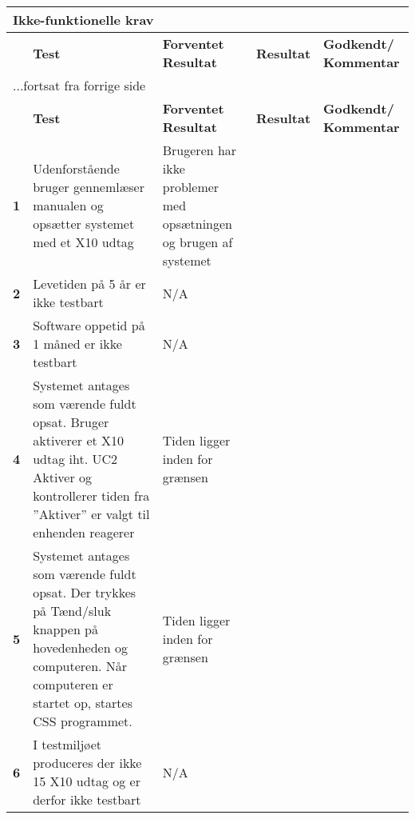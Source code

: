 
\begin{center}
\begin{longtable}{|p{}|p{}|p{}|p{}|p{}|} %
\hline
\multicolumn{5}{|l|}{\textbf{Ikke-funktionelle krav}} \\ \hline
\multicolumn{1}{|c|}{} &
\textbf{Test} &
\textbf{Forventet \newline Resultat} &
\textbf{Resultat} &
\textbf{Godkendt/ \newline Kommentar} \\ \hline 
\endfirsthead

\multicolumn{5}{l}{...fortsat fra forrige side} \\ \hline 
\multicolumn{1}{|c|}{} &
\textbf{Test} &
\textbf{Forventet \newline Resultat} &
\textbf{Resultat} &
\textbf{Godkendt/ \newline Kommentar} \\ \hline 
\endhead


\textbf{1} &
Udenforstående bruger gennemlæser manualen og opsætter systemet med et X10 udtag &
Brugeren har ikke problemer med opsætningen og brugen af systemet &
 &
  \\\hline

\textbf{2} &
Levetiden på 5 år er ikke testbart &
N/A &
 &
 \\\hline

\textbf{3} &
Software oppetid på 1 måned er ikke testbart &
N/A &
 &
 \\\hline

\textbf{4} &
Systemet antages som værende fuldt opsat.\newline
Bruger aktiverer et X10 udtag iht. UC2 Aktiver og kontrollerer tiden fra ''Aktiver'' er valgt til enhenden reagerer&
Tiden ligger inden for grænsen &
 &
 \\\hline

\textbf{5} &
Systemet antages som værende fuldt opsat.\newline
Der trykkes på Tænd/sluk knappen på hovedenheden og computeren. Når computeren er startet op, startes CSS programmet. &
Tiden ligger inden for grænsen &
 &
 \\\hline

\textbf{6} &
I testmiljøet produceres der ikke 15 X10 udtag og er derfor ikke testbart &
N/A  &
 &
 \\\hline


\end{longtable}
\end{center}
